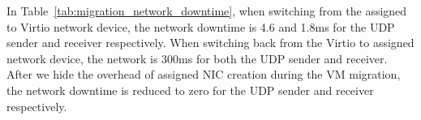 In Table~\ref{tab:migration_network_downtime}, when switching
from the assigned to Virtio network device, the network downtime
is 4.6 and 1.8ms for the UDP sender and receiver respectively. When
switching back from the Virtio to assigned network device, the
network is 300ms for both the UDP sender and receiver. 
After we hide the overhead of assigned NIC
creation during the VM migration, the network downtime is
reduced to zero for the UDP sender and receiver
respectively.

